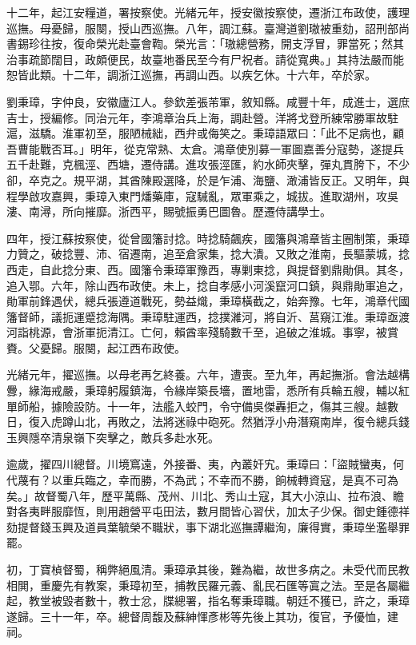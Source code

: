 \begin{pinyinscope}
十二年，起江安糧道，署按察使。光緒元年，授安徽按察使，遷浙江布政使，護理巡撫。母憂歸，服闋，授山西巡撫。八年，調江蘇。臺灣道劉璈被重劾，詔刑部尚書錫珍往按，復命榮光赴臺會鞫。榮光言：「璈總營務，開支浮冒，罪當死；然其治事疏節闊目，政頗便民，故臺地番民至今有尸祝者。請從寬典。」其持法嚴而能恕皆此類。十二年，調浙江巡撫，再調山西。以疾乞休。十六年，卒於家。

劉秉璋，字仲良，安徽廬江人。參欽差張芾軍，敘知縣。咸豐十年，成進士，選庶吉士，授編修。同治元年，李鴻章治兵上海，調赴營。洋將戈登所練常勝軍故駐滬，滋驕。淮軍初至，服陋械絀，西弁或侮笑之。秉璋語眾曰：「此不足病也，顧吾曹能戰否耳。」明年，從克常熟、太倉。鴻章使別募一軍圖嘉善分寇勢，遂提兵五千赴難，克楓涇、西塘，遷侍講。進攻張涇匯，約水師夾擊，彈丸貫胯下，不少卻，卒克之。規平湖，其酋陳殿選降，於是乍浦、海鹽、澉浦皆反正。又明年，與程學啟攻嘉興，秉璋入東門燔藥庫，寇駴亂，眾軍乘之，城拔。進取湖州，攻吳漊、南潯，所向摧靡。浙西平，賜號振勇巴圖魯。歷遷侍講學士。

四年，授江蘇按察使，從曾國籓討捻。時捻騎飆疾，國籓與鴻章皆主圈制策，秉璋力贊之，破捻豐、沛、宿遷南，追至倉家集，捻大潰。又敗之淮南，長驅蒙城，捻西走，自此捻分東、西。國籓令秉璋軍豫西，專剿東捻，與提督劉鼎勛俱。其冬，追入鄂。六年，除山西布政使。未上，捻自孝感小河溪竄河口鎮，與鼎勛軍追之，勛軍前鋒遇伏，總兵張遵道戰死，勢益熾，秉璋橫截之，始奔豫。七年，鴻章代國籓督師，議扼運蹙捻海隅。秉璋駐運西，捻撲濰河，將自沂、莒窺江淮。秉璋亟渡河詣桃源，會浙軍扼清江。亡何，賴酋率殘騎數千至，追破之淮城。事寧，被賞賚。父憂歸。服闋，起江西布政使。

光緒元年，擢巡撫。以母老再乞終養。六年，遭喪。至九年，再起撫浙。會法越構釁，緣海戒嚴，秉璋躬履鎮海，令緣岸築長墻，置地雷，悉所有兵輪五艘，輔以紅單師船，據險設防。十一年，法艦入蛟門，令守備吳傑轟拒之，傷其三艘。越數日，復入虎蹲山北，再敗之，法將迷祿中砲死。然猶浮小舟潛窺南岸，復令總兵錢玉興隱卒清泉嶺下突擊之，敵兵多赴水死。

逾歲，擢四川總督。川境窵遠，外接番、夷，內叢奸宄。秉璋曰：「盜賊蠻夷，何代蔑有？以重兵臨之，幸而勝，不為武；不幸而不勝，餉械轉資寇，是真不可為矣。」故督蜀八年，歷平萬縣、茂州、川北、秀山土寇，其大小涼山、拉布浪、瞻對各夷畔服靡恆，則用趙營平屯田法，數月間皆心習伏，加太子少保。御史鍾德祥劾提督錢玉興及道員葉毓榮不職狀，事下湖北巡撫譚繼洵，廉得實，秉璋坐濫舉罪罷。

初，丁寶楨督蜀，稱弊絕風清。秉璋承其後，難為繼，故世多病之。未受代而民教相閧，重慶先有教案，秉璋初至，捕教民羅元義、亂民石匯等寘之法。至是各屬繼起，教堂被毀者數十，教士忿，牒總署，指名奪秉璋職。朝廷不獲已，許之，秉璋遂歸。三十一年，卒。總督周馥及蘇紳惲彥彬等先後上其功，復官，予優恤，建祠。


\end{pinyinscope}
